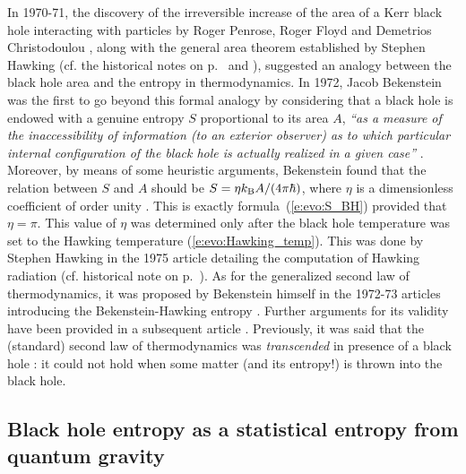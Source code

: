 \begin{hist}
In 1970-71, the discovery of
the irreversible increase of the area of a Kerr black hole interacting with particles
by Roger Penrose, Roger Floyd
and Demetrios Christodoulou
\cite{PenroF71,Chris70}, along with
the general area theorem established by Stephen Hawking \cite{Hawki71}
(cf. the historical notes on p.~\pageref{h:evo:irreducible_mass} and \pageref{h:evo:area_increase}),
suggested an analogy between the black hole area and the entropy in thermodynamics.
In 1972, Jacob Bekenstein  \cite{Beken72,Beken73b} was the first
to go beyond this formal analogy by considering that
a black hole is endowed with a genuine entropy $S$ proportional to its area $A$,
\emph{``as a measure of the inaccessibility of information (to an exterior observer) as to which
particular internal configuration of the black hole is actually realized in a given case''} \cite{Beken73b}.
Moreover, by means of some heuristic arguments, Bekenstein found that the relation
between $S$ and $A$ should be $S = \eta k_{\rm B} A/(4\pi\hbar)$, where $\eta$ is a dimensionless coefficient of
order unity \cite{Beken72,Beken73b}. This is exactly formula~(\ref{e:evo:S_BH}) provided that $\eta = \pi$.
This value of $\eta$ was determined only after the black hole temperature was set to the Hawking temperature
(\ref{e:evo:Hawking_temp}). This was done by Stephen Hawking in the 1975 article detailing the
computation of Hawking radiation \cite{Hawki75} (cf. historical note on p.~\pageref{h:evo:Hawking_rad}).
As for the generalized second law of thermodynamics, it was proposed by Bekenstein himself in the 1972-73 articles introducing the Bekenstein-Hawking entropy \cite{Beken72,Beken73b}.
Further arguments for its validity have been provided in a subsequent article \cite{Beken74}.
Previously, it was said that the (standard) second law of thermodynamics was \emph{transcended}
in presence of a black hole \cite{BardeCH73,Carte73b}: it could not hold when some matter (and its entropy!) is thrown into the black hole.
\end{hist}

\subsection{Black hole entropy as a statistical entropy from quantum gravity}


